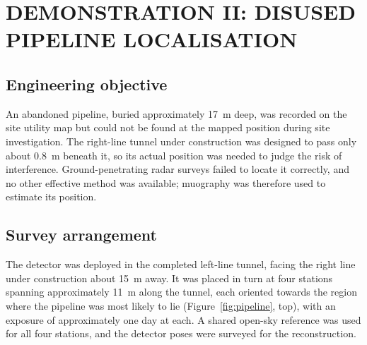 \documentclass{WTC2027}
\begin{document}
\section{DEMONSTRATION II: DISUSED PIPELINE LOCALISATION}
\subsection{Engineering objective}
An abandoned pipeline, buried approximately 17~m deep, was recorded on the site utility map but could not be found at the mapped position during site investigation. The right-line tunnel under construction was designed to pass only about 0.8~m beneath it, so its actual position was needed to judge the risk of interference. Ground-penetrating radar surveys failed to locate it correctly, and no other effective method was available; muography was therefore used to estimate its position.

\subsection{Survey arrangement}
The detector was deployed in the completed left-line tunnel, facing the right line under construction about 15~m away. It was placed in turn at four stations spanning approximately 11~m along the tunnel, each oriented towards the region where the pipeline was most likely to lie (Figure~\ref{fig:pipeline}, top), with an exposure of approximately one day at each. A shared open-sky reference was used for all four stations, and the detector poses were surveyed for the reconstruction.
\end{document}
